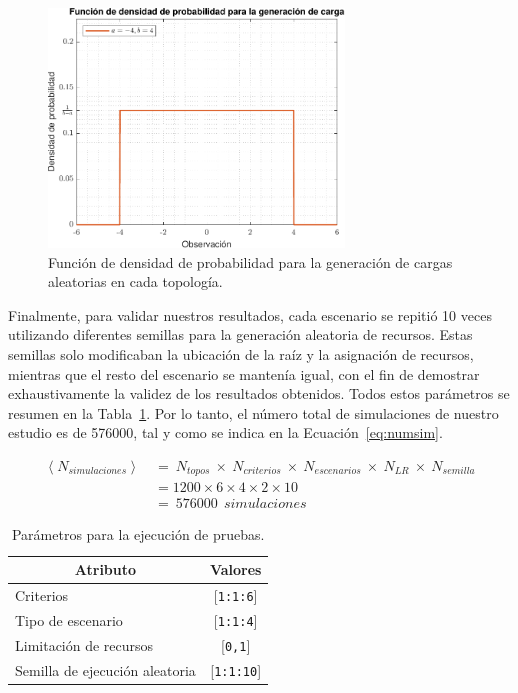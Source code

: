 \begin{figure}[ht!]
    \centering
    \includegraphics[width=0.7\textwidth]{fig/05_den2ne/den2ne_16.pdf}
    \caption{Función de densidad de probabilidad para la generación de cargas aleatorias en cada topología.}
    \label{fig:den2ne_16}
\end{figure}

Finalmente, para validar nuestros resultados, cada escenario se repitió 10 veces utilizando diferentes semillas para la generación aleatoria de recursos. Estas semillas solo modificaban la ubicación de la raíz y la asignación de recursos, mientras que el resto del escenario se mantenía igual, con el fin de demostrar exhaustivamente la validez de los resultados obtenidos. Todos estos parámetros se resumen en la Tabla~\ref{tab:testparams}. Por lo tanto, el número total de simulaciones de nuestro estudio es de 576000, tal y como se indica en la Ecuación~\ref{eq:numsim}.


\begin{equation}\label{eq:numsim}
\begin{aligned}
    \left \langle N_{simulaciones} \right \rangle  \: & = \: { N_{topos} \: \times \: N_{criterios} \: \times \:  N_{escenarios} \: \times \: N_{LR} \: \times \: N_{semilla}} \\ \: & = 1200 \times 6 \times 4 \times 2 \times 10 \\
    \: & = \: 576000 \: \: simulaciones
\end{aligned}    
\end{equation}
\vspace{0.2cm}

\begin{table}[ht!]
\centering
\begin{tabular}{|l|c|}
\hline
\multicolumn{1}{|c|}{\textbf{Atributo}} & \textbf{Valores} \\ \hline
Criterios & {[}\texttt{1:1:6}{]} \\ \hline
Tipo de escenario & {[}\texttt{1:1:4}{]} \\ \hline
Limitación de recursos & {[}\texttt{0,1}{]} \\ \hline
Semilla de ejecución aleatoria & {[}\texttt{1:1:10}{]} \\ \hline
\end{tabular}
\vspace{0.2cm}
\caption{Parámetros para la ejecución de pruebas.}
\label{tab:testparams}
\end{table}

